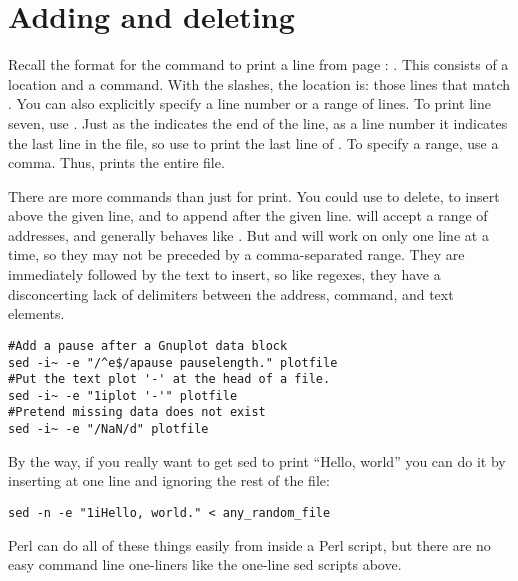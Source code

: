 

\section{Adding and deleting}

Recall the format for the command to print a line from page
\pageref{sedintro}: . This consists of a location and a
command. With the slashes, the location is: those lines that match
. You can also explicitly specify a line number or a range
of lines. To print line seven, use . Just as the \ci{\$} indicates the
end of the line, as a line number it indicates the last line in the
file, so use  to print the last line of
.  To specify a range, use a comma. Thus, 
 prints the entire file.

There are more commands than just  for print. You could use 
to delete,  to insert above the given line, and  to append
after the given line.  will accept a range of
addresses, and generally behaves like .
But  and  will work on only one line at a time, so they may
not be preceded by a comma-separated range. They are immediately followed
by the text to insert, so like regexes, they have a disconcerting lack of
delimiters between the address, command, and text elements.

\begin{lstlisting}
#Add a pause after a Gnuplot data block
sed -i~ -e "/^e$/apause pauselength." plotfile
#Put the text plot '-' at the head of a file.
sed -i~ -e "1iplot '-'" plotfile
#Pretend missing data does not exist
sed -i~ -e "/NaN/d" plotfile
\end{lstlisting}

By the way, if you really want to get sed to print ``Hello, world'' you
can do it by inserting at one line and ignoring the rest of the file:
\begin{lstlisting}
sed -n -e "1iHello, world." < any_random_file
\end{lstlisting}

Perl can do all of these things easily from inside a Perl script,
but there are no easy command line one-liners like the one-line sed
scripts above.

